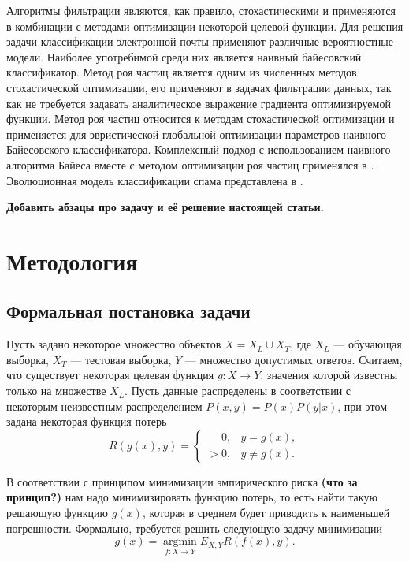 \documentclass[12pt]{article}
\begin{document}
Алгоритмы фильтрации являются, как правило, стохастическими \cite{Garg2021} 
и применяются в комбинации с методами оптимизации некоторой целевой функции. 
Для решения задачи классификации электронной почты применяют различные вероятностные модели. Наиболее употребимой среди них является наивный байесовский классификатор. Метод роя частиц является одним из численных методов стохастической оптимизации, его применяют в задачах фильтрации данных, так как не требуется задавать аналитическое выражение градиента оптимизируемой функции. 
Метод роя частиц относится к методам стохастической оптимизации и применяется для эвристической глобальной оптимизации параметров наивного Байесовского классификатора. Комплексный подход с использованием наивного алгоритма Байеса вместе с методом оптимизации роя частиц применялся в \cite{Parmar2020}. 
Эволюционная модель классификации спама представлена в \cite{Mohammad2020}. 

{
\bf\color{amaranth}
Добавить абзацы про задачу и её решение настоящей статьи.
}



\section{Методология}
\subsection{Формальная постановка задачи}
Пусть задано некоторое множество объектов $ X = X_L \cup X_T $, где 
$X_L$ --- обучающая выборка, 
$X_T$ --- тестовая выборка, 
$Y$ --- множество допустимых ответов. Считаем, что существует некоторая целевая функция $g: X \rightarrow Y$, значения которой известны только на множестве $X_L$. Пусть данные распределены в соответствии с некоторым неизвестным распределением $P(x,y) = P(x) P(y|x)$, при этом задана некоторая функция потерь
$$
R(g(x), y) = 
\begin{cases} 
\phantom{>}0, & y = g(x), \\
> 0, & y \neq g(x).
\end{cases}
$$

В соответствии с принципом минимизации эмпирического риска 
{\bf\color{amaranth} (что за принцип?)} нам надо минимизировать функцию потерь, то есть найти такую решающую функцию $g(x)$, которая в среднем будет приводить к наименьшей погрешности. Формально, требуется решить следующую задачу минимизации
$$
g(x) = \operatorname*{argmin}_{f: X \rightarrow Y} E_{X,Y} R(f(x), y).
$$
\end{document}
